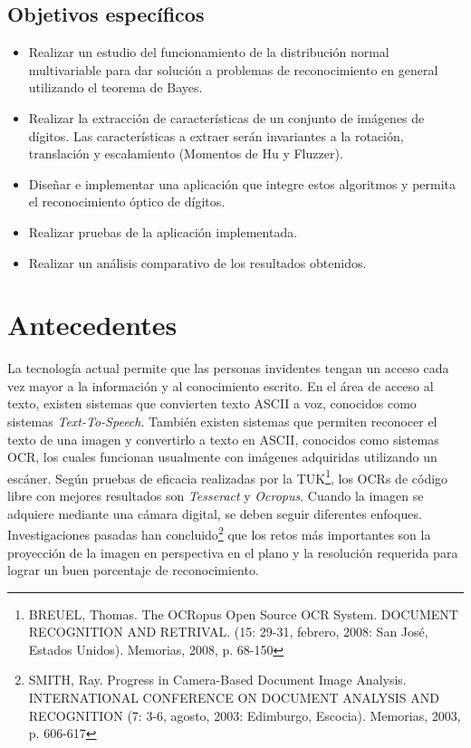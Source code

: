 \documentclass[a4paper, 11pt, oneside]{report}
\begin{document}
\subsection{Objetivos específicos}
	
	\begin{itemize}
	
	\item Realizar un estudio del funcionamiento de la distribución normal multivariable para dar solución a problemas de reconocimiento en general utilizando el teorema de Bayes.

	\item Realizar la extracción de características de un conjunto de imágenes de dígitos. Las características a extraer serán invariantes a la rotación, translación y escalamiento (Momentos de Hu y Fluzzer).
	
	\item Diseñar e implementar una aplicación que integre estos algoritmos y permita el reconocimiento óptico de dígitos.
	
	\item Realizar pruebas de la aplicación implementada.
	
	\item Realizar un análisis comparativo de los resultados obtenidos.

	\end{itemize}
	
\section {Antecedentes}

La tecnología actual permite que las personas invidentes tengan un acceso cada vez mayor a la información y al conocimiento escrito. En el área de acceso al texto, existen sistemas que convierten texto ASCII a voz, conocidos como sistemas \textit{Text-To-Speech}. También existen sistemas que permiten reconocer el texto de una imagen y convertirlo a texto en ASCII, conocidos como sistemas OCR, los cuales funcionan usualmente con imágenes adquiridas utilizando un escáner. Según pruebas de eficacia realizadas por la TUK\footnote{BREUEL, Thomas. The OCRopus Open Source OCR System. DOCUMENT RECOGNITION AND RETRIVAL. (15: 29-31, febrero, 2008: San José, Estados Unidos). Memorias, 2008, p. 68-150}, los OCRs de código libre con mejores resultados son \textit{Tesseract} y \textit{Ocropus}. Cuando la imagen se adquiere mediante una cámara digital, se deben seguir diferentes enfoques. Investigaciones pasadas han concluido\footnote{SMITH, Ray. Progress in Camera-Based Document Image Analysis. INTERNATIONAL CONFERENCE ON DOCUMENT ANALYSIS AND RECOGNITION (7: 3-6, agosto, 2003: Edimburgo, Escocia). Memorias, 2003, p. 606-617} que los retos más importantes son la proyección de la imagen en perspectiva en el plano y la resolución requerida para lograr un buen porcentaje de reconocimiento.
\end{document}
